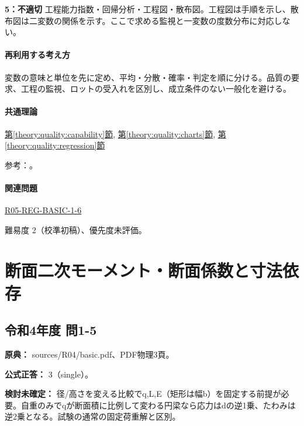 \noindent\textbf{5：不適切} 工程能力指数・回帰分析・工程図・散布図。工程図は手順を示し、散布図は二変数の関係を示す。ここで求める監視と一変数の度数分布に対応しない。\par

\paragraph{再利用する考え方} 変数の意味と単位を先に定め、平均・分散・確率・判定を順に分ける。品質の要求、工程の監視、ロットの受入れを区別し、成立条件のない一般化を避ける。

\paragraph{共通理論} \hyperref[theory:quality:capability]{第\ref*{theory:quality:capability}節}, \hyperref[theory:quality:charts]{第\ref*{theory:quality:charts}節}, \hyperref[theory:quality:regression]{第\ref*{theory:quality:regression}節}

\par 参考：\cite{quality_nist_capability,quality_nist_control,quality_nist_histogram,stat_psu_correlation}。

\paragraph{関連問題} \hyperref[q:r05-reg-basic-1-6]{R05-REG-BASIC-1-6}

\par 難易度 2（校準初稿）、優先度未評価。

\section{断面二次モーメント・断面係数と寸法依存}

\subsection{令和4年度 問1-5}
\label{q:r04-reg-basic-1-5}

\noindent\textbf{原典：} sources/R04/basic.pdf、PDF物理3頁。

\textbf{公式正答：} 3（single）。

\par\textbf{検討未確定：} 径/高さを変える比較でq,L,E（矩形は幅b）を固定する前提が必要。自重のみでqが断面積に比例して変わる円梁なら応力はdの逆1乗、たわみは逆2乗となる。試験の通常の固定荷重解と区別。

